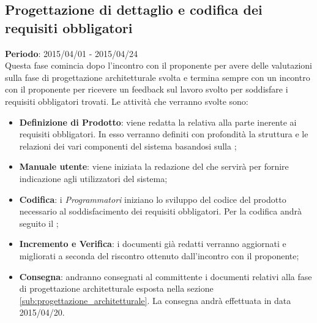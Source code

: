	\subsection{Progettazione di dettaglio e codifica dei requisiti obbligatori} %
	\label{sub:progettazione_di_dettaglio_e_codifica_dei_requisiti_obbligatori}
	\textbf{Periodo}:  2015/04/01 - 2015/04/24 \\
	Questa fase comincia dopo l'incontro con il proponente per avere delle valutazioni sulla fase di progettazione architetturale svolta e termina sempre con un incontro con il proponente per ricevere un feedback sul lavoro svolto per soddisfare i requisiti obbligatori trovati.
	Le attività che verranno svolte sono:
		\begin{itemize}
			\item \textbf{Definizione di Prodotto}: viene redatta la \docNameVersionDdP{} relativa alla parte inerente ai requisiti obbligatori. In esso verranno definiti con profondità la struttura e le relazioni dei vari componenti del sistema basandosi sulla \docNameVersionST;
			\item \textbf{Manuale utente}: viene iniziata la redazione del \docNameVersionMU{} che servirà per fornire indicazione agli utilizzatori del sistema;
			\item \textbf{Codifica}: i \emph{Programmatori} iniziano lo sviluppo del codice del prodotto necessario al soddisfacimento dei requisiti obbligatori. Per la codifica andrà seguito il \docNameVersionDdP;
			\item \textbf{Incremento e Verifica}: i documenti già redatti verranno aggiornati e migliorati a seconda del riscontro ottenuto dall'incontro con il proponente;
			\item \textbf{Consegna}: andranno consegnati al committente i documenti relativi alla fase di progettazione architetturale esposta nella sezione \ref{sub:progettazione_architetturale}. La consegna andrà effettuata in data 2015/04/20.
		\end{itemize}
		
